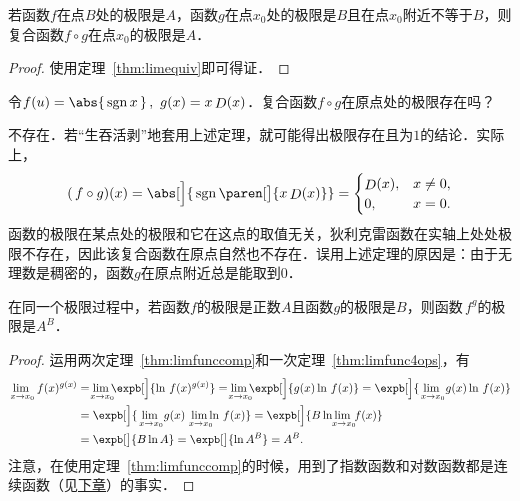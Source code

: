 \begin{theorem}[复合函数的极限]
  \label{thm:limfunccomp}
  若函数\(f\)在点\(B\)处的极限是\(A\)，函数\(g\)在点\(x_0\)处的极限是\(B\)且在点\(x_0\)附近不等于\(B\)，则复合函数\(f \circ g\)在点\(x_0\)的极限是\(A\)．

  \begin{proof}
    使用定理~\ref{thm:limequiv}即可得证．
  \end{proof}
\end{theorem}

\begin{example*}
  令\(f(u) = \abs{\,\sgn x\,}\,,\ g(x) = x \Fn D(x)\)．复合函数\(f \circ g\)在原点处的极限存在吗？

  \begin{remark}
    不存在．若“生吞活剥”地套用上述定理，就可能得出极限存在且为\(1\)的结论．实际上，
    \begin{equation*}
      (\,f \circ g)(x)
      = \abs[\Big]{\,\sgn\paren[\big]{x \Fn D(x)}} =
      \begin{cases}
        \Fn D(x), & x \ne 0, \\
        0, & x = 0.
      \end{cases}
    \end{equation*}
    函数的极限在某点处的极限和它在这点的取值无关，狄利克雷函数在实轴上处处极限不存在，因此该复合函数在原点自然也不存在．误用上述定理的原因是：由于无理数是稠密的，函数\(g\)在原点附近总是能取到\(0\)．
  \end{remark}
\end{example*}

\begin{theorem}
  \label{thm:limfuncpowexp}
  在同一个极限过程中，若函数\(f\)的极限是正数\(A\)且函数\(g\!\)的极限是\(B\)，则函数\(\,f^g\!\)的极限是\(A^B\)．

  \begin{proof}
    运用两次定理~\ref{thm:limfunccomp}和一次定理~\ref{thm:limfunc4ops}，有
    \begin{align*}
      \lim_{\,x \to x_0\!} \,f(x)^{g(x)}
      &= \smashoperator{\lim_{\,x \to x_0\!}} \expb[\Big]{\ln \,f(x)^{g(x)}}
        = \smashoperator{\lim_{\,x \to x_0\!}} \expb[\Big]{g(x) \ln \,f(x)}
        = \expb[\Big]{\lim_{\,x \to x_0\!} g(x) \ln \,f(x)} \\
      &= \expb[\Big]{\lim_{\,x \to x_0\!} g(x) \smashoperator[r]{\lim_{\,x \to x_0\!}} \ln \,f(x)}
        = \expb[\Big]{B \ln \smashoperator{\lim_{\,x \to x_0\!}} \,f(x)} \\
      &= \expb[\big]{B \ln A} = \expb[\big]{\ln A^B} = A^B.
    \end{align*}
    注意，在使用定理~\ref{thm:limfunccomp}的时候，用到了指数函数和对数函数都是连续函数（见\hyperref[ch:cont]{下章}）的事实．
  \end{proof}
\end{theorem}

